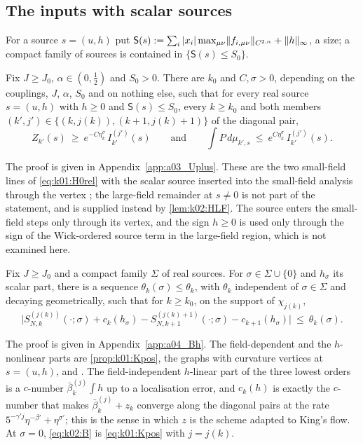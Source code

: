 \subsection{The inputs with scalar sources}\label{ssec:k02:inputs}

For a source $s=(u,h)$ put $\mathsf S(s):=\sum_i|x_i|\max_{\mu\nu}\lVert f_{i,\mu\nu}\rVert_{C^{2,\alpha}}+\lVert h\rVert_\infty$, a size; a compact family of sources is contained in $\{\mathsf S(s)\le S_0\}$.

\begin{proposition}\label{prop:k02:Uplus}
Fix $J\ge J_0$, $\alpha\in(0,\frac12)$ and $S_0>0$. There are $k_0$ and $C,\sigma>0$, depending on the couplings, $J$, $\alpha$, $S_0$ and on nothing else, such that for every real source $s=(u,h)$ with $h\ge0$ and $\mathsf S(s)\le S_0$, every $k\ge k_0$ and both members $(k',j')\in\{(k,j(k)),(k+1,j(k)+1)\}$ of the diagonal pair,
\begin{equation}\label{eq:k02:SF}
Z_{k'}(s)\ \ge\ e^{-C\eta_k^{\sigma}}\,I^{(j')}_{k'}(s)\qquad\text{and}\qquad \int P\,d\mu_{k',s}\ \le\ e^{C\eta_k^{\sigma}}\,I^{(j')}_{k'}(s).
\end{equation}
\end{proposition}
The proof is given in Appendix~\ref{app:a03_Uplus}. These are the two small-field lines of \eqref{eq:k01:H0rel} with the scalar source inserted into the small-field analysis through the vertex \cite[(3.21)]{K1}; the large-field remainder at $s\ne0$ is not part of the statement, and is supplied instead by \cref{lem:k02:HLF}. The source enters the small-field steps only through its vertex, and the sign $h\ge0$ is used only through the sign of the Wick-ordered source term in the large-field region, which is not examined here.

\begin{proposition}\label{prop:k02:Bh}
Fix $J\ge J_0$ and a compact family $\Sigma$ of real sources. For $\sigma\in\Sigma\cup\{0\}$ and $h_\sigma$ its scalar part, there is a sequence $\theta_k(\sigma)\le\theta_k$, with $\theta_k$ independent of $\sigma\in\Sigma$ and decaying geometrically, such that for $k\ge k_0$, on the support of $\chi_{j(k)}$,
\begin{equation}\label{eq:k02:B}
\big|S^{(j(k))}_{N,k}(\cdot;\sigma)+c_k(h_\sigma)-S^{(j(k)+1)}_{N,k+1}(\cdot;\sigma)-c_{k+1}(h_\sigma)\big|\ \le\ \theta_k(\sigma).
\end{equation}
\end{proposition}
The proof is given in Appendix~\ref{app:a04_Bh}. The field-dependent and the $h$-nonlinear parts are \cref{prop:k01:Kpos}, the graphs with curvature vertices at $s=(u,h)$, and \Kh. The field-independent $h$-linear part of the three lowest orders is a $c$-number $\bar\beta^{(j)}_k\int h$ up to a localisation error, and $c_k(h)$ is exactly the $c$-number that makes $\bar\beta^{(j)}_k+z_k$ converge along the diagonal pairs at the rate $5^{-\gamma'j}\eta^{-\beta'}+\eta^{\sigma'}$; this is the sense in which $z$ is the scheme adapted to King's flow. At $\sigma=0$, \eqref{eq:k02:B} is \eqref{eq:k01:Kpos} with $j=j(k)$.

